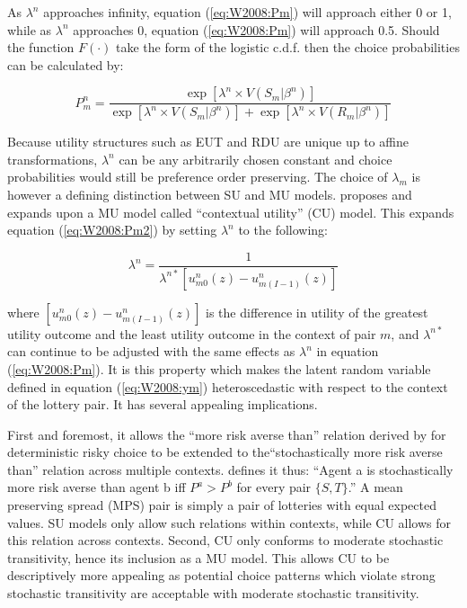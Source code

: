 \documentclass[../main.tex]{subfiles}
\begin{document}
As $\lambda^n$ approaches infinity, equation (\ref{eq:W2008:Pm}) will approach either 0 or 1, while as $\lambda^n$ approaches 0, equation (\ref{eq:W2008:Pm}) will approach 0.5.
Should the function $F(\cdot)$ take the form of the logistic c.d.f. then the choice probabilities can be calculated by:

\begin{equation}
	\label{eq:W2008:Pm2}
	P_m^n = \frac{\exp \left[ \lambda^n \times V(S_m | \beta^n) \right]}{  \exp \left[ \lambda^n \times V(S_m | \beta^n) \right] + \exp \left[ \lambda^n \times V(R_m | \beta^n) \right] }
\end{equation}

Because utility structures such as EUT and RDU are unique up to affine transformations, $\lambda^n$ can be any arbitrarily chosen constant and choice probabilities would still be preference order preserving.
The choice of $\lambda_m$ is however a defining distinction between SU and MU models.
\textcite{Wilcox2008} proposes and \textcite{Wilcox2011} expands upon a MU model called \enquote{contextual utility} (CU) model. This expands equation (\ref{eq:W2008:Pm2}) by setting $\lambda^n$ to the following:

\begin{equation}
	\lambda^n = \frac{1}{\lambda^{n*} \left[ u^n_{m0}(z) - u^n_{m(I-1)}(z) \right]}
\end{equation}

\noindent where $\left[ u^n_{m0}(z) - u^n_{m(I-1)}(z) \right]$ is the difference in utility of the greatest utility outcome and the least utility outcome in the context of pair $m$, and $\lambda^{n*}$ can continue to be adjusted with the same effects as $\lambda^n$ in equation (\ref{eq:W2008:Pm}).
It is this property which makes the latent random variable defined in equation (\ref{eq:W2008:ym}) heteroscedastic with respect to the context of the lottery pair.
It has several appealing implications.

First and foremost, it allows the \enquote{more risk averse than} relation derived by \textcite{Pratt1964} for deterministic risky choice to be extended to the\enquote{stochastically more risk averse than} relation across multiple contexts.
\textcite[89]{Wilcox2011} defines it thus: \enquote{Agent a is stochastically more risk averse than agent b \textelp{} iff $P^a > P^b$ for every  pair $\lbrace S, T \rbrace$.}
A mean preserving spread (MPS) pair is simply a pair of lotteries with equal expected values.
SU models only allow such relations within contexts, while CU allows for this relation across contexts.
Second, CU only conforms to moderate stochastic transitivity, hence its inclusion as a MU model.
This allows CU to be descriptively more appealing as potential choice patterns which violate strong stochastic transitivity are acceptable with moderate stochastic transitivity.
\end{document}
